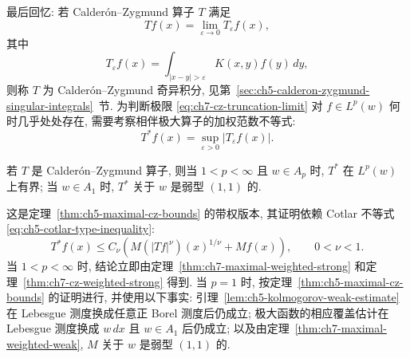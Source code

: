 最后回忆: 若 Calderón--Zygmund 算子 $T$ 满足
\begin{equation}
\label{eq:ch7-cz-truncation-limit}
 Tf(x)=\lim_{\varepsilon\to0}T_\varepsilon f(x),
\end{equation}
其中
\[
 T_\varepsilon f(x)=\int_{|x-y|>\varepsilon}K(x,y)f(y)\,dy,
\]
则称 $T$ 为 Calderón--Zygmund 奇异积分, 见第~\ref{sec:ch5-calderon-zygmund-singular-integrals}~节. 为判断极限 \eqref{eq:ch7-cz-truncation-limit} 对 $f\in L^p(w)$ 何时几乎处处存在, 需要考察相伴极大算子的加权范数不等式:
\[
 T^*f(x)=\sup_{\varepsilon>0}|T_\varepsilon f(x)|.
\]

\begin{Corollary}
\label{cor:ch7-maximal-cz-weighted}
若 $T$ 是 Calderón--Zygmund 算子, 则当 $1<p<\infty$ 且 $w\in A_p$ 时, $T^*$ 在 $L^p(w)$ 上有界; 当 $w\in A_1$ 时, $T^*$ 关于 $w$ 是弱型 $(1,1)$ 的.
\end{Corollary}

\begin{Proof}
这是定理~\ref{thm:ch5-maximal-cz-bounds} 的带权版本, 其证明依赖 Cotlar 不等式 \eqref{eq:ch5-cotlar-type-inequality}:
\[
 T^*f(x)\le C_\nu\left(M(|Tf|^\nu)(x)^{1/\nu}+Mf(x)\right),
 \qquad0<\nu<1.
\]
当 $1<p<\infty$ 时, 结论立即由定理~\ref{thm:ch7-maximal-weighted-strong} 和定理~\ref{thm:ch7-cz-weighted-strong} 得到. 当 $p=1$ 时, 按定理~\ref{thm:ch5-maximal-cz-bounds} 的证明进行, 并使用以下事实: 引理~\ref{lem:ch5-kolmogorov-weak-estimate} 在 Lebesgue 测度换成任意正 Borel 测度后仍成立; 极大函数的相应覆盖估计在 Lebesgue 测度换成 $w\,dx$ 且 $w\in A_1$ 后仍成立; 以及由定理~\ref{thm:ch7-maximal-weighted-weak}, $M$ 关于 $w$ 是弱型 $(1,1)$ 的.
\end{Proof}
